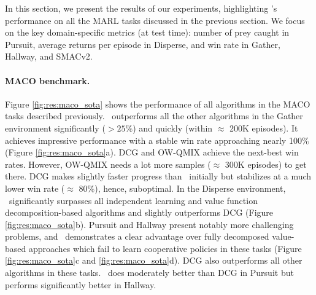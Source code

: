 
In this section, we present the results of our experiments, highlighting \algoabb's performance on all the MARL tasks discussed in the previous section. We focus on the key domain-specific metrics (at test time): number of prey caught in Pursuit, average returns per episode in Disperse, and win rate in Gather, Hallway, and SMACv2. 

\paragraph{MACO benchmark.} Figure \ref{fig:res:maco_sota} shows the performance of all algorithms in the MACO tasks described previously. \algoabb\ outperforms all the other algorithms in the Gather environment significantly ($> 25\%$) and quickly (within $\approx$ 200K episodes). It achieves impressive performance with a stable win rate approaching nearly 100\% (Figure \ref{fig:res:maco_sota}a). DCG and OW-QMIX achieve the next-best win rates. However, OW-QMIX needs a lot more samples ($\approx$ 300K episodes) to get there. DCG makes slightly faster progress than \algoabb\ initially but stabilizes at a much lower win rate ($\approx$ 80\%), hence, suboptimal. In the Disperse environment, \algoabb\ significantly surpasses all independent learning and value function decomposition-based algorithms and slightly outperforms DCG (Figure \ref{fig:res:maco_sota}b). Pursuit and Hallway present notably more challenging problems, and \algoabb\ demonstrates a clear advantage over fully decomposed value-based approaches which fail to learn cooperative policies in these tasks (Figure \ref{fig:res:maco_sota}c and \ref{fig:res:maco_sota}d). DCG also outperforms all other algorithms in these tasks. \algoabb\ does moderately better than DCG in Pursuit but performs significantly better in Hallway. 

